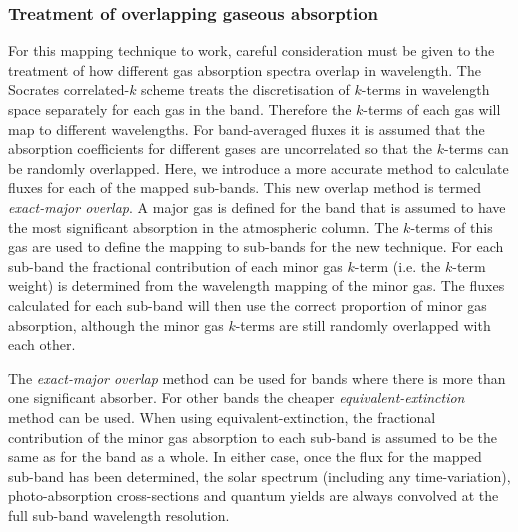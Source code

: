 \subsubsection{Treatment of overlapping gaseous absorption}
For this mapping technique to work, careful consideration must be given to the treatment of how different gas absorption spectra overlap in wavelength. The Socrates correlated-$k$ scheme treats the discretisation of $k$-terms in wavelength space separately for each gas in the band. Therefore the $k$-terms of each gas will map to different wavelengths. For band-averaged fluxes it is assumed that the absorption coefficients for different gases are uncorrelated so that the $k$-terms can be randomly overlapped. Here, we introduce a more accurate method to calculate fluxes for each of the mapped sub-bands. This new overlap method is termed {\em exact-major overlap}. A major gas is defined for the band that is assumed to have the most significant absorption in the atmospheric column. The $k$-terms of this gas are used to define the mapping to sub-bands for the new technique. For each sub-band the fractional contribution of each minor gas $k$-term (i.e. the $k$-term weight) is determined from the wavelength mapping of the minor gas. The fluxes calculated for each sub-band will then use the correct proportion of minor gas absorption, although the minor gas $k$-terms are still randomly overlapped with each other.

The {\em exact-major overlap} method can be used for bands where there is more than one significant absorber. For other bands the cheaper {\em equivalent-extinction} method can be used. When using equivalent-extinction, the fractional contribution of the minor gas absorption to each sub-band is assumed to be the same as for the band as a whole. In either case, once the flux for the mapped sub-band has been determined, the solar spectrum (including any time-variation), photo-absorption cross-sections and quantum yields are always convolved at the full sub-band wavelength resolution.

